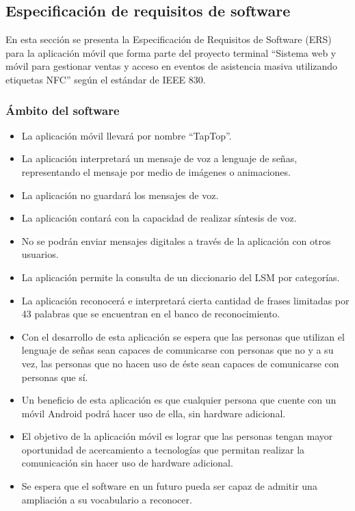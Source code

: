 \subsection{Especificación de requisitos de software}

En esta sección se presenta la Especificación de Requisitos de Software (ERS) para la aplicación móvil que forma parte del proyecto terminal “Sistema web y móvil para gestionar ventas y acceso en eventos de asistencia masiva utilizando etiquetas NFC” según el estándar de IEEE 830.



\subsubsection{Ámbito del software}

\begin{itemize}
\item	La aplicación móvil llevará por nombre “TapTop”.
\item	La aplicación interpretará un mensaje de voz a lenguaje de señas, representando el mensaje por medio de imágenes o animaciones.
\item	La aplicación no guardará los mensajes de voz.
\item	La aplicación contará con la capacidad de realizar síntesis de voz.
\item	No se podrán enviar mensajes digitales a través de la aplicación con otros usuarios.
\item	La aplicación permite la consulta de un diccionario del LSM por categorías.
\item	La aplicación reconocerá e interpretará cierta cantidad de frases limitadas por 43 palabras que se encuentran en el banco de reconocimiento.
\item	Con el desarrollo de esta aplicación se espera que las personas que utilizan el lenguaje de señas sean capaces de comunicarse con personas que no y a su vez, las personas que no hacen uso de éste sean capaces de comunicarse con personas que sí.
\item	Un beneficio de esta aplicación es que cualquier persona que cuente con un móvil Android podrá hacer uso de ella, sin hardware adicional.
\item	El objetivo de la aplicación móvil es lograr que las personas tengan mayor oportunidad de acercamiento a tecnologías que permitan realizar la comunicación sin hacer uso de hardware adicional.
\item	Se espera que el software en un futuro pueda ser capaz de admitir una ampliación a su vocabulario a reconocer.
\end{itemize}

